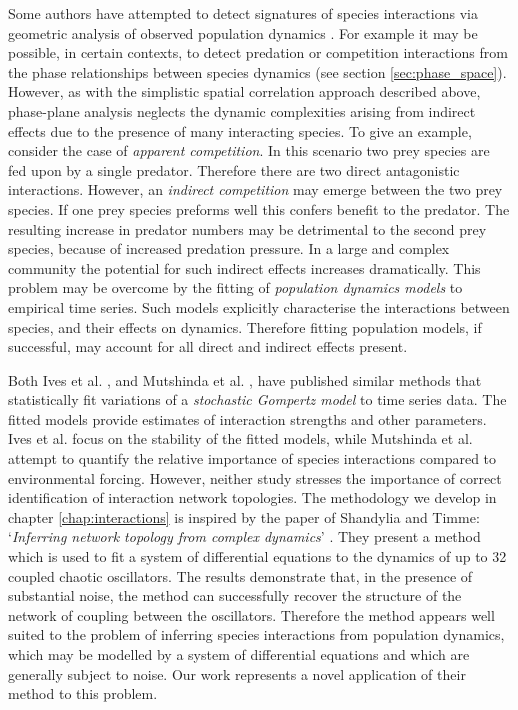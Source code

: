 Some authors have attempted to detect signatures of species interactions via geometric analysis of observed population dynamics \cite{gilpin1973hares,sandvik2004using,froda2009simple}. For example it may be possible, in certain contexts, to detect predation or competition interactions from the phase relationships between species dynamics \cite{sandvik2004using} (see section \ref{sec:phase_space}). However, as with the simplistic spatial correlation approach described above, phase-plane analysis neglects the dynamic complexities arising from indirect effects due to the presence of many interacting species. To give an example, consider the case of \emph{apparent competition}. In this scenario two prey species are fed upon by a single predator. Therefore there are two direct antagonistic interactions. However, an \emph{indirect competition} may emerge between the two prey species. If one prey species preforms well this confers benefit to the predator. The resulting increase in predator numbers may be detrimental to the second prey species, because of increased predation pressure. In a large and complex community the potential for such indirect effects increases dramatically. This problem may be overcome by the fitting of \emph{population dynamics models} to empirical time series. Such models explicitly characterise the interactions between species, and their effects on dynamics. Therefore fitting population models, if successful, may account for all direct and indirect effects present.

Both Ives et al. \cite{ives2003estimating}, and Mutshinda et al. \cite{mutshinda2009drives}, have published similar methods that statistically fit variations of a \emph{stochastic Gompertz model} \cite{saitoh1997density} to time series data. The fitted models provide estimates of interaction strengths and other parameters. Ives et al. focus on the stability of the fitted models, while Mutshinda et al. attempt to quantify the relative importance of species interactions compared to environmental forcing. However, neither study stresses the importance of correct identification of interaction network topologies. The methodology we develop in chapter \ref{chap:interactions} is inspired by the paper of Shandylia and Timme: `\emph{Inferring network topology from complex dynamics}' \cite{shandilya2011inferring}. They present a method  which is used to fit a system of differential equations to the dynamics of up to 32 coupled chaotic oscillators. The results demonstrate that, in the presence of substantial noise, the method can successfully recover the structure of the network of coupling between the oscillators. Therefore the method appears well suited to the problem of inferring species interactions from population dynamics, which may be modelled by a system of differential equations and which are generally subject to noise. Our work represents a novel application of their method to this problem.


